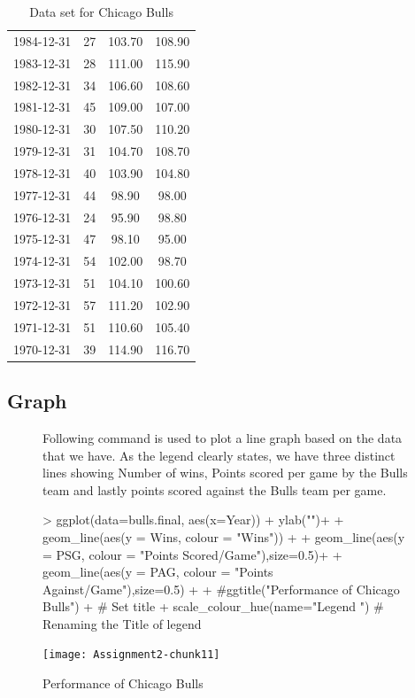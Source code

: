 \documentclass[a4paper]{article}
\begin{document}
\begin{table}[H]
\begin{tabular}{| c | c | c | c|}
  1984-12-31 & 27 & 103.70 & 108.90 \\ 
  1983-12-31 & 28 & 111.00 & 115.90 \\ 
  1982-12-31 & 34 & 106.60 & 108.60 \\ 
  1981-12-31 & 45 & 109.00 & 107.00 \\ 
  1980-12-31 & 30 & 107.50 & 110.20 \\ 
  1979-12-31 & 31 & 104.70 & 108.70 \\ 
  1978-12-31 & 40 & 103.90 & 104.80 \\ 
  1977-12-31 & 44 & 98.90 & 98.00 \\ 
  1976-12-31 & 24 & 95.90 & 98.80 \\ 
  1975-12-31 & 47 & 98.10 & 95.00 \\ 
  1974-12-31 & 54 & 102.00 & 98.70 \\ 
  1973-12-31 & 51 & 104.10 & 100.60 \\ 
  1972-12-31 & 57 & 111.20 & 102.90 \\ 
  1971-12-31 & 51 & 110.60 & 105.40 \\ 
  1970-12-31 & 39 & 114.90 & 116.70 \\ 
   \hline
\end{tabular}\caption{Data set for Chicago Bulls}
\label{dataTable}
\end{table}





\subsection{Graph}
\begin{figure}[H]

Following command is used to plot a line graph based on the data that we have.
As the legend clearly states, we have three distinct lines showing Number of wins, Points scored per game by the Bulls team and lastly points scored against the Bulls team per game.

\begin{Schunk}
\begin{Sinput}
> ggplot(data=bulls.final, aes(x=Year)) + ylab("")+
+   geom_line(aes(y = Wins, colour = "Wins")) + 
+   geom_line(aes(y = PSG, colour = "Points Scored/Game"),size=0.5)+
+   geom_line(aes(y = PAG, colour = "Points Against/Game"),size=0.5) +
+   #ggtitle("Performance of Chicago Bulls") +   # Set title
+   scale_colour_hue(name="Legend ") # Renaming the Title of legend
\end{Sinput}
\end{Schunk}
\texttt{[image: Assignment2-chunk11]}
\caption{Performance of Chicago Bulls}
\label{PerChicagoBullsLogo}
\end{figure}
\end{document}
